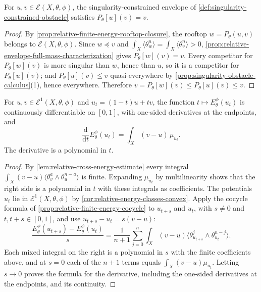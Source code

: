 \begin{corollary}\label{cor:mutual-full-mass-singularity-envelopes}
For $u,v\in\mathcal E(X,\theta,\phi)$, the singularity-constrained envelope of \cref{def:singularity-constrained-obstacle} satisfies $P_\theta[u](v)=v$.
\end{corollary}
\begin{proof}
By \cref{prop:relative-finite-energy-rooftop-closure}, the rooftop $w=P_\theta(u,v)$ belongs to $\mathcal E(X,\theta,\phi)$. Since $w\preceq v$ and $\int_X\langle\theta_w^n\rangle=\int_X\langle\theta_v^n\rangle>0$, \cref{prop:relative-envelope-full-mass-characterization} gives $P_\theta[w](v)=v$. Every competitor for $P_\theta[w](v)$ is more singular than $w$, hence than $u$, so it is a competitor for $P_\theta[u](v)$; and $P_\theta[u](v)\leq v$ quasi-everywhere by \cref{prop:singularity-obstacle-calculus}(1), hence everywhere. Therefore $v=P_\theta[w](v)\leq P_\theta[u](v)\leq v$.
\end{proof}

\begin{proposition}\label{prop:finite-energy-affine-first-variation}
For $u,v\in\mathcal E^1(X,\theta,\phi)$ and $u_t=(1-t)u+tv$, the function $t\mapsto E_\theta^\phi(u_t)$ is continuously differentiable on $[0,1]$, with one-sided derivatives at the endpoints, and
\[
 \frac{\mathrm d}{\mathrm dt}E_\theta^\phi(u_t)
                                  =\int_X(v-u)\,\mu_{u_t}.
\]
The derivative is a polynomial in $t$.
\end{proposition}
\begin{proof}
By \cref{lem:relative-cross-energy-estimate} every integral $\int_X(v-u)\langle\theta_v^a\wedge\theta_u^{n-a}\rangle$ is finite. Expanding $\mu_{u_t}$ by multilinearity shows that the right side is a polynomial in $t$ with these integrals as coefficients. The potentials $u_t$ lie in $\mathcal E^1(X,\theta,\phi)$ by \cref{cor:relative-energy-classes-convex}. Apply the cocycle formula of \cref{prop:relative-finite-energy-cocycle} to $u_{t+s}$ and $u_t$, with $s\neq0$ and $t,t+s\in[0,1]$, and use $u_{t+s}-u_t=s(v-u)$:
\[
 \frac{E_\theta^\phi(u_{t+s})-E_\theta^\phi(u_t)}s
 =\frac1{n+1}\sum_{j=0}^n\int_X(v-u)\langle\theta_{u_{t+s}}^j\wedge\theta_{u_t}^{n-j}\rangle.
\]
Each mixed integral on the right is a polynomial in $s$ with the finite coefficients above, and at $s=0$ each of the $n+1$ terms equals $\int_X(v-u)\mu_{u_t}$. Letting $s\to0$ proves the formula for the derivative, including the one-sided derivatives at the endpoints, and its continuity.
\end{proof}


